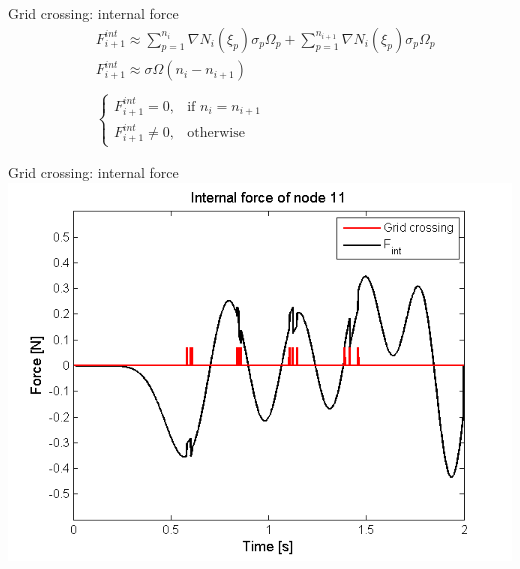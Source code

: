 \documentclass[mathserif,professionalfont]{beamer}
\begin{document}
\begin{frame}{Grid crossing: internal force}
 \begin{align}\nonumber
  & F^{int}_{i+1} \approx \sum_{p=1}^{n_i} \nabla N_i(\xi_p)\sigma_p \Omega_p + \sum_{p=1}^{n_{i+1}}\nabla N_i(\xi_p) \sigma_p \Omega_p\\ \nonumber
  & F^{int}_{i+1} \approx \sigma \Omega (n_i - n_{i+1})\\ \nonumber
  & \: \\ \nonumber
  & \begin{cases}F^{int}_{i+1} = 0, &\mbox{if } n_{i} = n_{i+1} \\
F^{int}_{i+1} \neq 0, & \mbox{otherwise} \end{cases}  
 \end{align}
\end{frame}

\begin{frame}{Grid crossing: internal force}
\centering
\includegraphics[width=0.7\paperwidth,height=0.7\paperheight]{images/vib5}
\end{frame}
\end{document}
